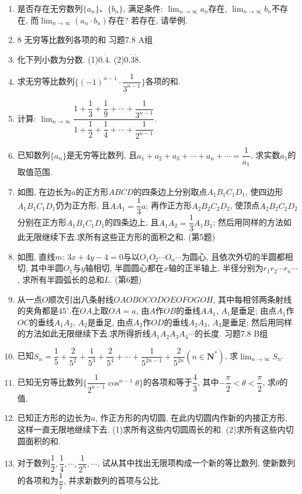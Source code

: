 \documentclass[10pt,a4paper]{article}
\newcommand{\blank}[1]{\underline{\hbox to #1pt{}}}
\begin{document}
\begin{enumerate}[1.]
(3)若$\displaystyle\lim_{n\to\infty}\dfrac{2^n}{{2^{n+1}}+{a^n}}=\dfrac 12$, 则实数$a$的取值范围是\blank{50}.
\item 是否存在无穷数列$\{a_n\}$、$\{b_n\}$, 满足条件: $\displaystyle\lim_{n\to\infty}a_n$存在, $\displaystyle\lim_{n\to\infty}b_n$不存在, 而$\displaystyle\lim_{n\to\infty}(a_n\cdot b_n)$存在? 若存在, 请举例.
\item 8  无穷等比数列各项的和
习题7.8  A组
\item 化下列小数为分数.
(1)$0.\dot4$.								(2)$0.\dot3\dot8$.
\item 求无穷等比数列$\{(-1)^{n-1}\cdot \dfrac 1{3^{n-1}}\}$各项的和.
\item 计算: $\displaystyle\lim_{n\to\infty}\dfrac{1+\dfrac 13+\dfrac 19+\cdots +\dfrac 1{{3^{n-1}}}}{1+\dfrac 12+\dfrac 14+\cdots +\dfrac 1{{2^{n-1}}}}$.
\item 已知数列$\{a_n\}$是无穷等比数列, 且$a_1+a_2+a_3+\cdots +a_n+\cdots =\dfrac 1{a_1}$, 求实数$a_1$的取值范围.
\item 如图, 在边长为$a$的正方形$ABCD$的四条边上分别取点$A_1B_1C_1D_1$, 使四边形$A_1B_1C_1D_1$仍为正方形, 且$AA_1=\dfrac 13a$; 再作正方形$A_2B_2C_2D_2$, 使顶点$A_2B_2C_2D_2$分别在正方形$A_1B_1C_1D_1$的四条边上, 且$A_1A_2=\dfrac 13A_1B_1$; 然后用同样的方法如此无限继续下去.求所有这些正方形的面积之和.
(第5题)
\item 如图, 直线$m$: $3x+4y-4=0$与以$O_1O_2\cdots O_n\cdots$为圆心, 且依次外切的半圆都相切, 其中半圆$O_1$与$y$轴相切, 半圆圆心都在$x$轴的正半轴上, 半径分别为$r_1r_2\cdots r_n\cdots$, 求所有半圆弧长的总和$L$.
(第6题)
\item 从一点$O$顺次引出八条射线$OAOBOCODOEOFOGOH$, 其中每相邻两条射线的夹角都是$45^{\circ }$.在$OA$上取$OA=a$, 由$A$作$OB$的垂线$AA_1$, $A_1$是垂足; 由点$A_1$作$OC$的垂线$A_1A_2$, $A_2$是垂足, 由点$A_2$作$OD$的垂线$A_2A_3$, $A_3$是垂足; 然后用同样的方法如此无限继续下去.求所得折线$A_1A_2A_3A_4\cdots$的长度.
习题7.8  B组
\item 已知$S_n=\dfrac 15+\dfrac 2{5^2}+\dfrac 1{5^3}+\dfrac 2{5^4}+\cdots +\dfrac 1{5^{2n-1}}+\dfrac 2{5^{2n}}(n\in \mathbf{N}^*)$, 求$\displaystyle\lim_{n\to\infty}S_n$.
\item 已知无穷等比数列$\{\dfrac 1{2^{n-1}}\cos ^{n-1}\theta\}$的各项和等于$\dfrac 43$, 其中$-\dfrac{\pi }2<\theta <\dfrac{\pi }2$, 求$\theta$的值.
\item 已知正方形的边长为$a$, 作正方形的内切圆, 在此内切圆内作新的内接正方形, 这样一直无限地继续下去.
(1)求所有这些内切圆周长的和.
(2)求所有这些内切圆面积的和.
\item 对于数列$\dfrac 12,\dfrac 14,\cdots ,\dfrac 1{2^n},\cdots$, 试从其中找出无限项构成一个新的等比数列, 使新数列的各项和为$\dfrac 17$, 并求新数列的首项与公比.

\end{enumerate}
\end{document}
